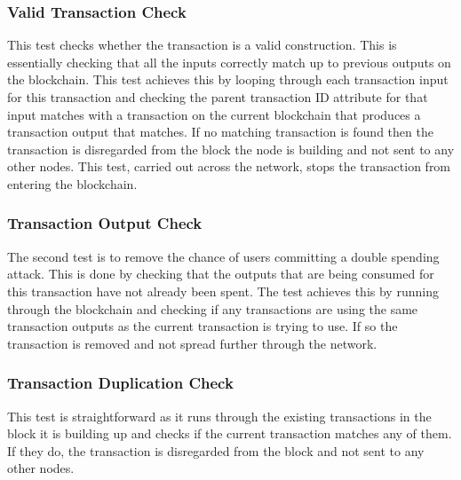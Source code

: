 \documentclass{l4proj}
\begin{document}
\subsubsection{Valid Transaction Check}
This test checks whether the transaction is a valid construction. This is essentially checking that all the inputs
correctly match up to previous outputs on the blockchain. This test achieves this by looping through each transaction
input for this transaction and checking the parent transaction ID attribute for that input matches with a transaction
on the current blockchain that produces a transaction output that matches. If no matching transaction is found
then the transaction is disregarded from the block the node is building and not sent to any other nodes. This test,
carried out across the network, stops the transaction from entering the blockchain.

\subsubsection{Transaction Output Check}
The second test is to remove the chance of users committing a double spending attack. This is done by checking
that the outputs that are being consumed for this transaction have not already been spent. The test achieves this
by running through the blockchain and checking if any transactions are using the same transaction outputs 
as the current transaction is trying to use. If so the transaction is removed and not spread further through
the network.

\subsubsection{Transaction Duplication Check}
This test is straightforward as it runs through the existing transactions in the block it is building up and
checks if the current transaction matches any of them. If they do, the transaction is disregarded from the
block and not sent to any other nodes.
\end{document}
